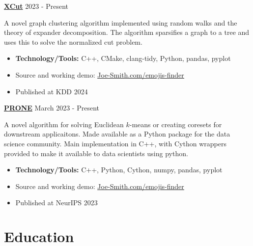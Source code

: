 \documentclass[letterpaper, 10pt]{article}
\newcommand{\bulletSpace}{\vspace{-4pt}}
\newcommand{\secStartSpace}{\vspace{3pt}}
\newcommand{\secEndSpace}{\vspace{5pt}}
\newcommand{\spaceCollapse}{\vspace{-2pt}}
\newcommand{\projectHeader}[3]{
\noindent\href{#2}{\large\textbf{#1}} \hfill \normalsize#3 \vspace{2pt}
}
\begin{document}
\begin{addmargin}[0.5em]{1em}

		
	\projectHeader{XCut}{https://gitlab.com/Joe-Smith}{ 2023 - Present}
		
	\noindent A novel graph clustering algorithm implemented using random walks and the theory of expander decomposition.
	The algorithm sparsifies a graph to a tree and uses this to solve the normalized cut problem.
	\spaceCollapse
	\begin{itemize}
		\item \textbf{Technology/Tools:} C++, CMake, clang-tidy, Python, pandas, pyplot
		      \bulletSpace
		\item Source and working demo:  \href{https://github.com/Joe-Smith}{\underline{Joe-Smith.com/emojis-finder}}
		\item Published at KDD 2024
	\end{itemize}

     \vspace{8pt}
 
	\projectHeader{PRONE}{https://github.com/Joe-Smith}{March 2023 - Present}
		
	\noindent A novel algorithm for solving Euclidean $k$-means or creating coresets for downstream applicaitons. 
	Made available as a Python package for the data science community.
	Main implementation in C++, with Cython wrappers provided to make it available to data scientists using python.
	\spaceCollapse
	\begin{itemize}
		\item \textbf{Technology/Tools:} C++, Python, Cython, numpy, pandas, pyplot
		      \bulletSpace
		\item Source and working demo:  \href{https://github.com/Joe-Smith}{\underline{Joe-Smith.com/emojis-finder}}
		\item Published at NeurIPS 2023
	\end{itemize}
\end{addmargin}
\secEndSpace
\secEndSpace


\section{\color{blue} \textbf{Education}}
\secStartSpace
\end{document}
